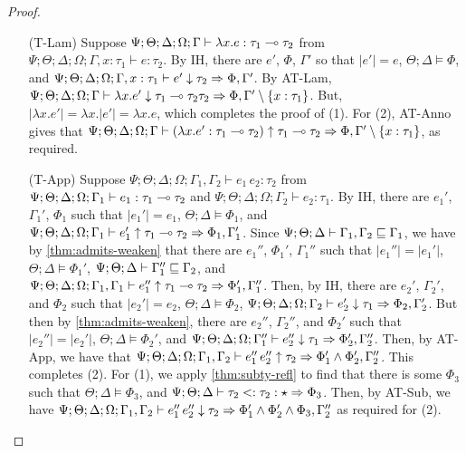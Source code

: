 \begin{proof}
\begin{itemize}
  \item[(T-Lam)] Suppose $\Psi ; \Theta ; \Delta ; \Omega ; \Gamma\vdash \lambda x.e : \tau_1 \multimap \tau_2$ from $\Psi ; \Theta ; \Delta ; \Omega ; \Gamma, x : \tau_1 \vdash e : \tau_2$. By IH, there are $e'$, $\Phi$, $\Gamma'$ so that $|e'| = e$, $\Theta ; \Delta \vDash \Phi$, and $\Psi ; \Theta ; \Delta ; \Omega ; \Gamma, x : \tau_1 \vdash e' \downarrow \tau_2 \Rightarrow \Phi,\Gamma'$. By AT-Lam, $\Psi ; \Theta ; \Delta ; \Omega ; \Gamma \vdash \lambda x. e' \downarrow \tau_1 \multimap \tau_2 \tau_2 \Rightarrow \Phi,\Gamma' \setminus \{x : \tau_1\}$. But, $|\lambda x. e'| = \lambda x. |e'| = \lambda x.e$, which completes the proof of (1). For (2), AT-Anno gives that $\Psi ; \Theta ; \Delta ; \Omega ; \Gamma \vdash (\lambda x. e' : \tau_1 \multimap \tau_2) \uparrow \tau_1 \multimap \tau_2 \Rightarrow \Phi,\Gamma' \setminus \{x : \tau_1\}$, as required.
  
  \item[(T-App)] Suppose $\Psi ; \Theta ; \Delta ; \Omega ; \Gamma_1,\Gamma_2\vdash e_1 \, e_2 :  \tau_2$ from
  $\Psi ; \Theta ; \Delta ; \Omega ; \Gamma_1\vdash e_1 : \tau_1 \multimap \tau_2$ and
  $\Psi ; \Theta ; \Delta ; \Omega ; \Gamma_2\vdash e_2 : \tau_1$.
  By IH, there are $e_1'$, $\Gamma_1'$, $\Phi_1$ such that
  $|e_1'| = e_1$,
  $\Theta ; \Delta \vDash \Phi_1$, and
  $\Psi ; \Theta ; \Delta ; \Omega ; \Gamma_1 \vdash e_1' \uparrow \tau_1 \multimap \tau_2 \Rightarrow \Phi_1,\Gamma_1'$.
  Since $\Psi ; \Theta ; \Delta \vdash \Gamma_1,\Gamma_2 \sqsubseteq \Gamma_1$,
  we have by \autoref{thm:admits-weaken} that there are $e_1''$, $\Phi_1'$, $\Gamma_1''$ such that
  $|e_1''| = |e_1'|$,
  $\Theta ; \Delta \vDash \Phi_1'$,
  $\Psi ; \Theta ; \Delta \vdash \Gamma_1'' \sqsubseteq \Gamma_2$, and
  $\Psi ; \Theta ; \Delta ; \Omega ; \Gamma_1,\Gamma_1 \vdash e_1'' \uparrow \tau_1 \multimap \tau_2 \Rightarrow \Phi_1',\Gamma_1''$.
  Then, by IH, there are $e_2'$, $\Gamma_2'$, and $\Phi_2$ such that
  $|e_2'| = e_2$,
  $\Theta ; \Delta \vDash \Phi_2$,
  $\Psi ; \Theta ; \Delta ; \Omega ; \Gamma_2 \vdash e_2' \downarrow \tau_1 \Rightarrow \Phi_2,\Gamma_2'$.
  But then by \autoref{thm:admits-weaken}, there are $e_2''$, $\Gamma_2''$, and $\Phi_2'$ such that
  $|e_2''| = |e_2'|$,
  $\Theta ; \Delta \vDash \Phi_2'$, and
  $\Psi ; \Theta ; \Delta ; \Omega; \Gamma_1'' \vdash e_2'' \downarrow \tau_1 \Rightarrow \Phi_2',\Gamma_2''$.
  Then, by AT-App, we have that
  $\Psi ; \Theta ; \Delta ; \Omega ; \Gamma_1,\Gamma_2 \vdash e_1'' \, e_2'' \uparrow \tau_2 \Rightarrow \Phi_1' \wedge \Phi_2',\Gamma_2''$.
  This completes (2). For (1), 
  we apply \autoref{thm:subty-refl} to find that there is some $\Phi_3$ such that $\Theta ; \Delta \vDash \Phi_3$, and
  $\Psi ; \Theta ; \Delta \vdash \tau_2 <: \tau_2 : \star \Rightarrow \Phi_3$.
  Then, by AT-Sub, we have
  $\Psi ; \Theta ; \Delta ; \Omega ; \Gamma_1,\Gamma_2 \vdash e_1'' \, e_2'' \downarrow \tau_2 \Rightarrow \Phi_1' \wedge \Phi_2' \wedge \Phi_3,\Gamma_2''$
  as required for (2).
  

\end{itemize}
\end{proof}
